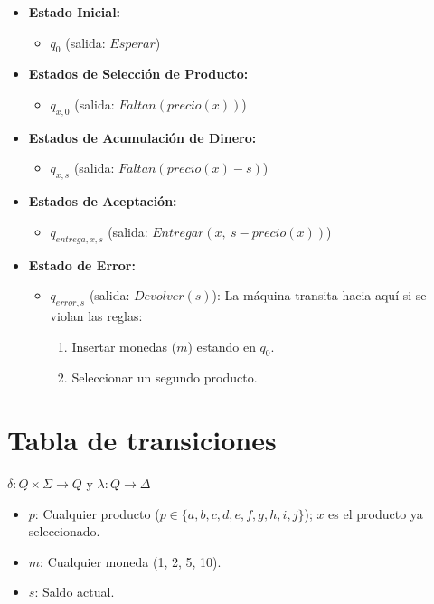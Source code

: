 \documentclass{article}
\begin{document}
\begin{itemize}
    \item \textbf{Estado Inicial:}
    \begin{itemize}
        \item $q_0$ \quad (salida: $Esperar$)
    \end{itemize}
    
    \item \textbf{Estados de Selección de Producto:}
    \begin{itemize}
        \item $q_{x, 0}$ \quad (salida: $Faltan(precio(x))$)
    \end{itemize}

    \item \textbf{Estados de Acumulación de Dinero:}
    \begin{itemize}
        \item $q_{x, s}$ \quad (salida: $Faltan(precio(x) - s)$)
    \end{itemize}

    \item \textbf{Estados de Aceptación:}
    \begin{itemize}
        \item $q_{entrega, x, s}$ \quad (salida: $Entregar(x,\ s - precio(x))$)
    \end{itemize}

    \item \textbf{Estado de Error:}
    \begin{itemize}
        \item $q_{error, s}$ \quad (salida: $Devolver(s)$): La máquina transita hacia aquí si se violan las reglas:
        \begin{enumerate}
            \item Insertar monedas ($m$) estando en $q_0$.
            \item Seleccionar un segundo producto.
        \end{enumerate}
    \end{itemize}
\end{itemize}

\section{Tabla de transiciones}
$\delta: Q \times \Sigma \to Q$ \quad y \quad $\lambda: Q \to \Delta$

\begin{itemize}
    \item $p$: Cualquier producto ($p \in \{a,b,c,d,e,f,g,h,i,j\}$); $x$ es el producto ya seleccionado.
    \item $m$: Cualquier moneda (1, 2, 5, 10).
    \item $s$: Saldo actual.
\end{itemize}
\end{document}

